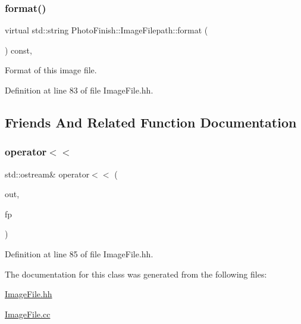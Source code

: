 \subsubsection{\texorpdfstring{format()}{format()}}
{\footnotesize\ttfamily virtual std\+::string Photo\+Finish\+::\+Image\+Filepath\+::format (\begin{DoxyParamCaption}\item[{void}]{ }\end{DoxyParamCaption}) const\hspace{0.3cm}{\ttfamily [inline]}, {\ttfamily [virtual]}}



Format of this image file. 



Definition at line 83 of file Image\+File.\+hh.



\subsection{Friends And Related Function Documentation}
\mbox{\label{class_photo_finish_1_1_image_filepath_a1eee4f55a949c2f66f1200d87c0e0f7c}} 
\subsubsection{\texorpdfstring{operator$<$$<$}{operator<<}}
{\footnotesize\ttfamily std\+::ostream\& operator$<$$<$ (\begin{DoxyParamCaption}\item[{std\+::ostream \&}]{out,  }\item[{const \hyperlink{class_photo_finish_1_1_image_filepath}{Image\+Filepath} \&}]{fp }\end{DoxyParamCaption})\hspace{0.3cm}{\ttfamily [friend]}}



Definition at line 85 of file Image\+File.\+hh.



The documentation for this class was generated from the following files\+:\begin{DoxyCompactItemize}
\item 
\hyperlink{_image_file_8hh}{Image\+File.\+hh}\item 
\hyperlink{_image_file_8cc}{Image\+File.\+cc}\end{DoxyCompactItemize}
